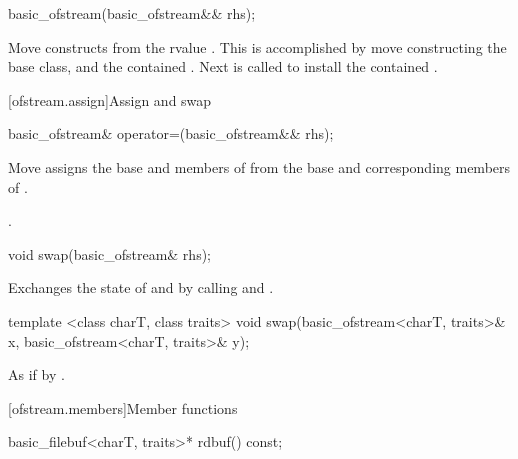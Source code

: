 %
\begin{itemdecl}
basic_ofstream(basic_ofstream&& rhs);
\end{itemdecl}

\begin{itemdescr}
\pnum
\effects Move constructs from the rvalue . This
is accomplished by move constructing the base class, and the contained
. Next
 is called to install
the contained .
\end{itemdescr}

[ofstream.assign]{Assign and swap}

%
\begin{itemdecl}
basic_ofstream& operator=(basic_ofstream&& rhs);
\end{itemdecl}

\begin{itemdescr}
\pnum
\effects Move assigns the base and members of  from the base and corresponding
members of .

\pnum
\returns {}.
\end{itemdescr}

%
\begin{itemdecl}
void swap(basic_ofstream& rhs);
\end{itemdecl}

\begin{itemdescr}
\pnum
\effects Exchanges the state of 
and  by calling
 and
.
\end{itemdescr}

%
\begin{itemdecl}
template <class charT, class traits>
  void swap(basic_ofstream<charT, traits>& x,
            basic_ofstream<charT, traits>& y);
\end{itemdecl}

\begin{itemdescr}
\pnum
\effects As if by .
\end{itemdescr}

[ofstream.members]{Member functions}

%
\begin{itemdecl}
basic_filebuf<charT, traits>* rdbuf() const;
\end{itemdecl}

